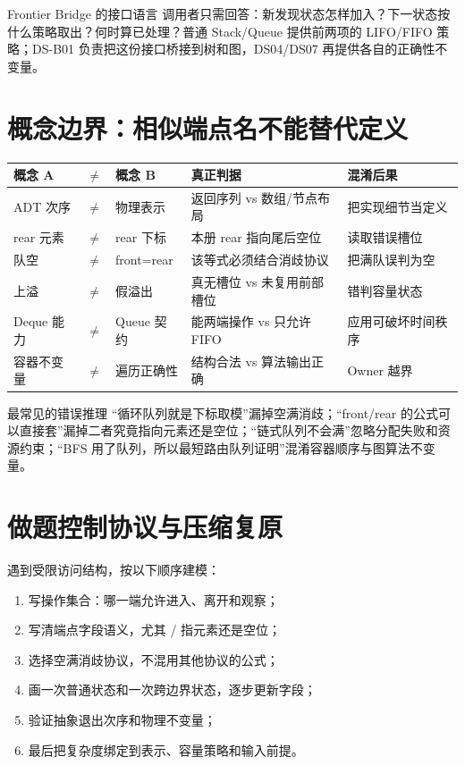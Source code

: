 \documentclass[UTF8,fontset=none,11pt,a4paper]{ctexart}
\begin{document}
\begin{methodbox}{Frontier Bridge 的接口语言}
调用者只需回答：新发现状态怎样加入？下一状态按什么策略取出？何时算已处理？普通 Stack/Queue 提供前两项的 LIFO/FIFO 策略；DS-B01 负责把这份接口桥接到树和图，DS04/DS07 再提供各自的正确性不变量。
\end{methodbox}

\section{概念边界：相似端点名不能替代定义}
\begin{center}\small
\begin{tabularx}{\linewidth}{L{1.8cm}C{0.35cm}L{1.8cm}YY}
\toprule
概念 A & $\neq$ & 概念 B & 真正判据 & 混淆后果\\
\midrule
ADT 次序 & $\neq$ & 物理表示 & 返回序列 vs 数组/节点布局 & 把实现细节当定义\\
rear 元素 & $\neq$ & rear 下标 & 本册 rear 指向尾后空位 & 读取错误槽位\\
队空 & $\neq$ & front=rear & 该等式必须结合消歧协议 & 把满队误判为空\\
上溢 & $\neq$ & 假溢出 & 真无槽位 vs 未复用前部槽位 & 错判容量状态\\
Deque 能力 & $\neq$ & Queue 契约 & 能两端操作 vs 只允许 FIFO & 应用可破坏时间秩序\\
容器不变量 & $\neq$ & 遍历正确性 & 结构合法 vs 算法输出正确 & Owner 越界\\
\bottomrule
\end{tabularx}
\end{center}

\begin{warnbox}{最常见的错误推理}
“循环队列就是下标取模”漏掉空满消歧；“front/rear 的公式可以直接套”漏掉二者究竟指向元素还是空位；“链式队列不会满”忽略分配失败和资源约束；“BFS 用了队列，所以最短路由队列证明”混淆容器顺序与图算法不变量。
\end{warnbox}

\section{做题控制协议与压缩复原}
遇到受限访问结构，按以下顺序建模：
\begin{enumerate}
\item 写操作集合：哪一端允许进入、离开和观察；
\item 写清端点字段语义，尤其 / 指元素还是空位；
\item 选择空满消歧协议，不混用其他协议的公式；
\item 画一次普通状态和一次跨边界状态，逐步更新字段；
\item 验证抽象退出次序和物理不变量；
\item 最后把复杂度绑定到表示、容量策略和输入前提。
\end{enumerate}
\end{document}
